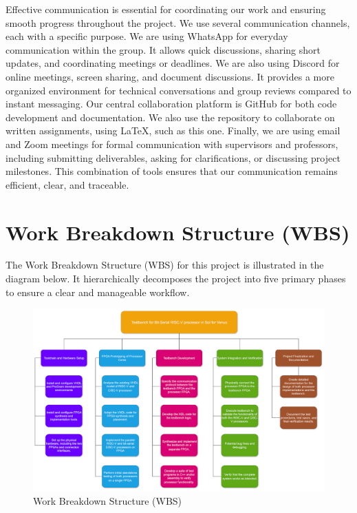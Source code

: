 \documentclass[10pt]{article}
\begin{document}
Effective communication is essential for coordinating our work and ensuring smooth progress throughout the project. We use several communication channels, each with a specific purpose.  
We are using WhatsApp for everyday communication within the group. It allows quick discussions, sharing short updates, and coordinating meetings or deadlines.  
We are also using Discord for online meetings, screen sharing, and document discussions. It provides a more organized environment for technical conversations and group reviews compared to instant messaging.  
Our central collaboration platform is GitHub for both code development and documentation. We also use the repository to collaborate on written assignments, using LaTeX, such as this one.  
Finally, we are using email and Zoom meetings for formal communication with supervisors and professors, including submitting deliverables, asking for clarifications, or discussing project milestones.  
This combination of tools ensures that our communication remains efficient, clear, and traceable.

\FloatBarrier
\section{Work Breakdown Structure (WBS)}

The Work Breakdown Structure (WBS) for this project is illustrated in the diagram below. It hierarchically decomposes the project into five primary phases to ensure a clear and manageable workflow.\\

\begin{figure}[h]
\centering
\includegraphics[width=\linewidth]{WBS.png}
\caption{Work Breakdown Structure (WBS)}
\label{fig:timeline}
\end{figure}
\end{document}
